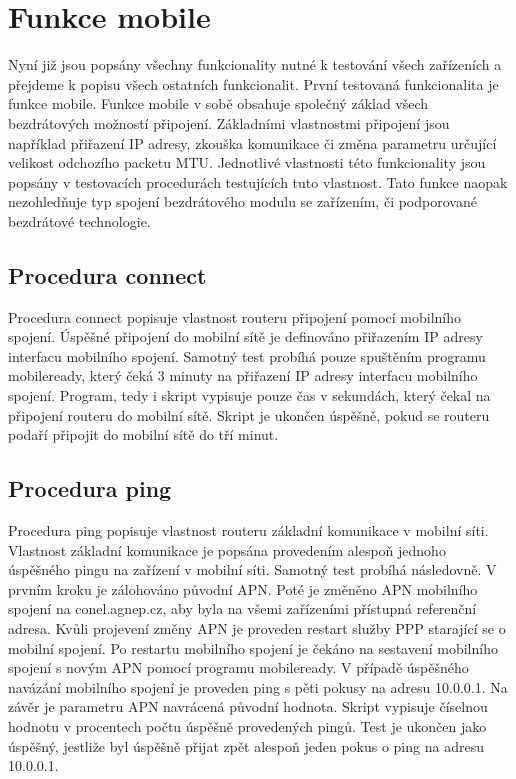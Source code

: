 \section{Funkce mobile}
Nyní již jsou popsány všechny funkcionality nutné k testování všech zařízeních a přejdeme k popisu všech ostatních funkcionalit. První testovaná funkcionalita je funkce mobile. Funkce mobile v sobě obsahuje společný základ všech bezdrátových možností připojení. Základními vlastnostmi připojení jsou například přiřazení IP adresy, zkouška komunikace či změna parametru určující velikost odchozího packetu MTU. Jednotlivé vlastnosti této funkcionality jsou popsány v testovacích procedurách testujících tuto vlastnost. Tato funkce naopak nezohledňuje typ spojení bezdrátového modulu se zařízením, či podporované bezdrátové technologie.

\subsection{Procedura connect}
Procedura connect popisuje vlastnost routeru připojení pomocí mobilního spojení. Úspěšné připojení do mobilní sítě je definováno přiřazením IP adresy interfacu mobilního spojení. Samotný test probíhá pouze spuštěním programu mobileready, který čeká 3 minuty na přiřazení IP adresy interfacu mobilního spojení. Program, tedy i skript vypisuje pouze čas v sekundách, který čekal na připojení routeru do mobilní sítě. Skript je ukončen úspěšně, pokud se routeru podaří připojit do mobilní sítě do tří minut.

\subsection{Procedura ping}
Procedura ping popisuje vlastnost routeru základní komunikace v mobilní síti. Vlastnost základní komunikace je popsána provedením alespoň jednoho úspěšného pingu na zařízení v mobilní síti. Samotný test probíhá následovně. V prvním kroku je zálohováno původní APN. Poté je změněno APN mobilního spojení na conel.agnep.cz, aby byla na všemi zařízeními přístupná referenční adresa. Kvůli projevení změny APN je proveden restart služby PPP starající se o mobilní spojení. Po restartu mobilního spojení je čekáno na sestavení mobilního spojení s novým APN pomocí programu mobileready. V případě úspěšného navázání mobilního spojení je proveden ping s pěti pokusy na adresu 10.0.0.1. Na závěr je parametru APN navrácená původní hodnota. Skript vypisuje číselnou hodnotu v procentech počtu úspěšně provedených pingů. Test je ukončen jako úspěšný, jestliže byl úspěšně přijat zpět alespoň jeden pokus o ping na adresu 10.0.0.1.

